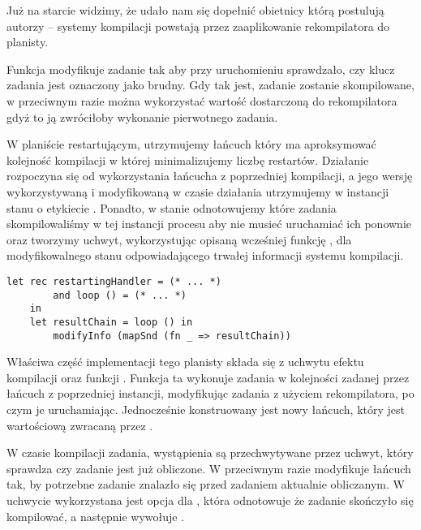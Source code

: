 

Już na starcie widzimy, że udało nam się dopełnić obietnicy którą postulują autorzy \BSaLC{} -- systemy kompilacji powstają przez zaaplikowanie rekompilatora do planisty.

Funkcja  modyfikuje zadanie tak aby przy uruchomieniu sprawdzało, czy klucz zadania jest oznaczony jako brudny. Gdy tak jest, zadanie zostanie skompilowane, w przeciwnym razie można wykorzystać wartość dostarczoną do rekompilatora gdyż to ją zwróciłoby wykonanie pierwotnego zadania. 



W planiście restartującym, utrzymujemy łańcuch który ma aproksymować kolejność kompilacji w której minimalizujemy liczbę restartów. Działanie rozpoczyna się od wykorzystania łańcucha z poprzedniej kompilacji, a jego wersję wykorzystywaną i modyfikowaną w czasie działania utrzymujemy w instancji stanu o etykiecie . Ponadto, w stanie  odnotowujemy które zadania skompilowaliśmy w tej instancji procesu aby nie musieć uruchamiać ich ponownie oraz tworzymy uchwyt, wykorzystując opisaną wcześniej funkcję , dla modyfikowalnego stanu odpowiadającego trwałej informacji systemu kompilacji.


\vspace{-1.25em}
\begin{lstlisting}[style=Haleff-long]
    let rec restartingHandler = (* ... *)
        and loop () = (* ... *)
    in
    let resultChain = loop () in
        modifyInfo (mapSnd (fn _ => resultChain))
\end{lstlisting}

Właściwa część implementacji tego planisty składa się z uchwytu efektu kompilacji  oraz funkcji . Funkcja ta wykonuje zadania w kolejności zadanej przez łańcuch z poprzedniej instancji, modyfikując zadania z użyciem rekompilatora, po czym je uruchamiając. Jednocześnie konstruowany jest nowy łańcuch, który jest wartościową zwracaną przez .



W czasie kompilacji zadania, wystąpienia  są przechwytywane przez uchwyt, który sprawdza czy zadanie jest już obliczone. W przeciwnym razie modyfikuje łańcuch tak, by potrzebne zadanie znalazło się przed zadaniem aktualnie obliczanym. W uchwycie wykorzystana jest opcja dla , która odnotowuje że zadanie skończyło się kompilować, a następnie wywołuje .


